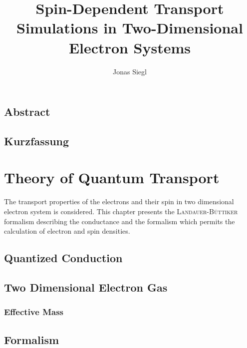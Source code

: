 
\author{Jonas Siegl}
\title{Spin-Dependent Transport Simulations in Two-Dimensional Electron Systems}






\pagestyle{plain} %
\tableofcontents
\clearpage
\section*{Abstract}

\clearpage
\section*{Kurzfassung}

\clearpage
\pagestyle{main}
\chapter{Theory of Quantum Transport}
The transport properties of the electrons and their spin in two dimensional electron system is considered. This chapter presents the \textsc{Landauer-B\"uttiker} formalism describing the conductance and the \gfnc{} formalism which permits the calculation of electron and spin densities.
\section{Quantized Conduction}
  
  \section{Two Dimensional Electron Gas}
    
      \subsection{Effective Mass \hamil{}}
	
	
  \section{\cgfnc{} Formalism}
  
